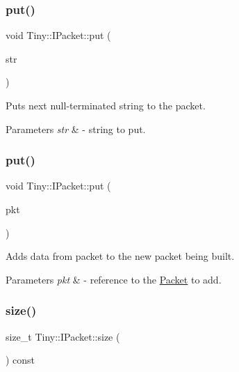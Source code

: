 \subsubsection{\texorpdfstring{put()}{put()}\hspace{0.1cm}{\footnotesize\ttfamily [6/7]}}
{\footnotesize\ttfamily void Tiny\+::\+I\+Packet\+::put (\begin{DoxyParamCaption}\item[{const char $\ast$}]{str }\end{DoxyParamCaption})\hspace{0.3cm}{\ttfamily [inline]}}

Puts next null-\/terminated string to the packet. 
\begin{DoxyParams}{Parameters}
{\em str} & -\/ string to put. \\
\hline
\end{DoxyParams}
\mbox{\label{classTiny_1_1IPacket_a5ebc1e6507e7255a8babddbae82dcb2a}} 
\subsubsection{\texorpdfstring{put()}{put()}\hspace{0.1cm}{\footnotesize\ttfamily [7/7]}}
{\footnotesize\ttfamily void Tiny\+::\+I\+Packet\+::put (\begin{DoxyParamCaption}\item[{const \hyperlink{classTiny_1_1IPacket}{I\+Packet} \&}]{pkt }\end{DoxyParamCaption})\hspace{0.3cm}{\ttfamily [inline]}}

Adds data from packet to the new packet being built. 
\begin{DoxyParams}{Parameters}
{\em pkt} & -\/ reference to the \hyperlink{classTiny_1_1Packet}{Packet} to add. \\
\hline
\end{DoxyParams}
\mbox{\label{classTiny_1_1IPacket_a76b6389f0d47b67c8428c58c2b09df51}} 
\subsubsection{\texorpdfstring{size()}{size()}}
{\footnotesize\ttfamily size\+\_\+t Tiny\+::\+I\+Packet\+::size (\begin{DoxyParamCaption}{ }\end{DoxyParamCaption}) const\hspace{0.3cm}{\ttfamily [inline]}}

